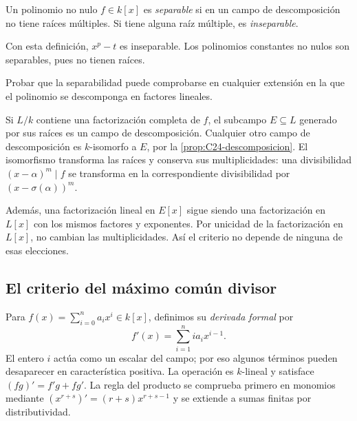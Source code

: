 \begin{defi}
Un polinomio no nulo $f\in k[x]$ es \emph{separable} si en un campo de descomposición no tiene raíces múltiples. Si tiene alguna raíz múltiple, es \emph{inseparable}.
\end{defi}
Con esta definición, $x^p-t$ es inseparable. Los polinomios constantes no nulos son separables, pues no tienen raíces.

\begin{ejer}\label{ejer:C25-multiplicidades}
Probar que la separabilidad puede comprobarse en cualquier extensión en la que el polinomio se descomponga en factores lineales.
\end{ejer}
\begin{sol}
Si $L/k$ contiene una factorización completa de $f$, el subcampo $E\subseteq L$ generado por sus raíces es un campo de descomposición. Cualquier otro campo de descomposición es $k$-isomorfo a $E$, por la \cref{prop:C24-descomposicion}. El isomorfismo transforma las raíces y conserva sus multiplicidades: una divisibilidad $(x-\alpha)^m\mid f$ se transforma en la correspondiente divisibilidad por $(x-\sigma(\alpha))^m$.

Además, una factorización lineal en $E[x]$ sigue siendo una factorización en $L[x]$ con los mismos factores y exponentes. Por unicidad de la factorización en $L[x]$, no cambian las multiplicidades. Así el criterio no depende de ninguna de esas elecciones.
\end{sol}

\subsection{El criterio del máximo común divisor}\label{tema:25-2-2}
Para $f(x)=\sum_{i=0}^n a_ix^i\in k[x]$, definimos su \emph{derivada formal} por
\[
f'(x)=\sum_{i=1}^n i a_i x^{i-1}.
\]
El entero $i$ actúa como un escalar del campo; por eso algunos términos pueden desaparecer en característica positiva. La operación es $k$-lineal y satisface $(fg)'=f'g+fg'$. La regla del producto se comprueba primero en monomios mediante $(x^{r+s})'=(r+s)x^{r+s-1}$ y se extiende a sumas finitas por distributividad.

